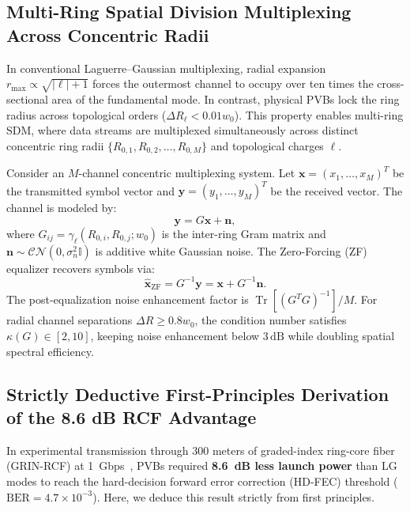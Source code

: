 \documentclass[11pt,a4paper]{article}
\begin{document}
\subsection{Multi-Ring Spatial Division Multiplexing Across Concentric Radii}

In conventional Laguerre--Gaussian multiplexing, radial expansion $r_{\max} \propto \sqrt{|\ell| + 1}$ forces the outermost channel to occupy over ten times the cross-sectional area of the fundamental mode. In contrast, physical PVBs lock the ring radius across topological orders ($\Delta R_\ell < 0.01 w_0$). This property enables multi-ring SDM, where data streams are multiplexed simultaneously across distinct concentric ring radii $\{R_{0, 1}, R_{0, 2}, \dots, R_{0, M}\}$ and topological charges $\ell$.

Consider an $M$-channel concentric multiplexing system. Let $\mathbf{x} = (x_1, \dots, x_M)^T$ be the transmitted symbol vector and $\mathbf{y} = (y_1, \dots, y_M)^T$ be the received vector. The channel is modeled by:
\begin{equation}
\mathbf{y} = G \mathbf{x} + \mathbf{n},
\label{eq:channel_model}
\end{equation}
where $G_{ij} = \gamma_\ell(R_{0, i}, R_{0, j}; w_0)$ is the inter-ring Gram matrix and $\mathbf{n} \sim \mathcal{CN}(0, \sigma_n^2 \mathbb{I})$ is additive white Gaussian noise. The Zero-Forcing (ZF) equalizer recovers symbols via:
\begin{equation}
\hat{\mathbf{x}}_{\text{ZF}} = G^{-1} \mathbf{y} = \mathbf{x} + G^{-1} \mathbf{n}.
\label{eq:zf_equalizer}
\end{equation}
The post-equalization noise enhancement factor is $\operatorname{Tr}[(G^T G)^{-1}] / M$. For radial channel separations $\Delta R \ge 0.8 w_0$, the condition number satisfies $\kappa(G) \in [2, 10]$, keeping noise enhancement below $3\,\text{dB}$ while doubling spatial spectral efficiency.

\subsection{Strictly Deductive First-Principles Derivation of the 8.6 dB RCF Advantage}

In experimental transmission through 300 meters of graded-index ring-core fiber (GRIN-RCF) at 1~Gbps~\cite{Villalba2023}, PVBs required \textbf{8.6~dB less launch power} than LG modes to reach the hard-decision forward error correction (HD-FEC) threshold ($\text{BER} = 4.7 \times 10^{-3}$). Here, we deduce this result strictly from first principles.
\end{document}
